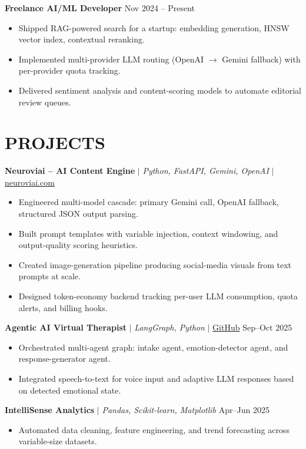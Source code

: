\documentclass[10pt]{article}
\begin{document}
\textbf{Freelance AI/ML Developer} \hfill Nov 2024 -- Present
\begin{itemize}
\item Shipped RAG-powered search for a startup: embedding generation, HNSW vector index, contextual reranking.
\item Implemented multi-provider LLM routing (OpenAI $\rightarrow$ Gemini fallback) with per-provider quota tracking.
\item Delivered sentiment analysis and content-scoring models to automate editorial review queues.
\end{itemize}

\section*{PROJECTS}
\textbf{Neuroviai -- AI Content Engine} $|$ \textit{Python, FastAPI, Gemini, OpenAI} $|$ \href{https://neuroviai.com}{neuroviai.com}
\begin{itemize}
\item Engineered multi-model cascade: primary Gemini call, OpenAI fallback, structured JSON output parsing.
\item Built prompt templates with variable injection, context windowing, and output-quality scoring heuristics.
\item Created image-generation pipeline producing social-media visuals from text prompts at scale.
\item Designed token-economy backend tracking per-user LLM consumption, quota alerts, and billing hooks.
\end{itemize}

\textbf{Agentic AI Virtual Therapist} $|$ \textit{LangGraph, Python} $|$ \href{https://github.com/JeetInTech/Virtual-Therapist---LangGraph-Agentic-AI-System}{GitHub} \hfill Sep--Oct 2025
\begin{itemize}
\item Orchestrated multi-agent graph: intake agent, emotion-detector agent, and response-generator agent.
\item Integrated speech-to-text for voice input and adaptive LLM responses based on detected emotional state.
\end{itemize}

\textbf{IntelliSense Analytics} $|$ \textit{Pandas, Scikit-learn, Matplotlib} \hfill Apr--Jun 2025
\begin{itemize}
\item Automated data cleaning, feature engineering, and trend forecasting across variable-size datasets.
\end{itemize}
\end{document}
